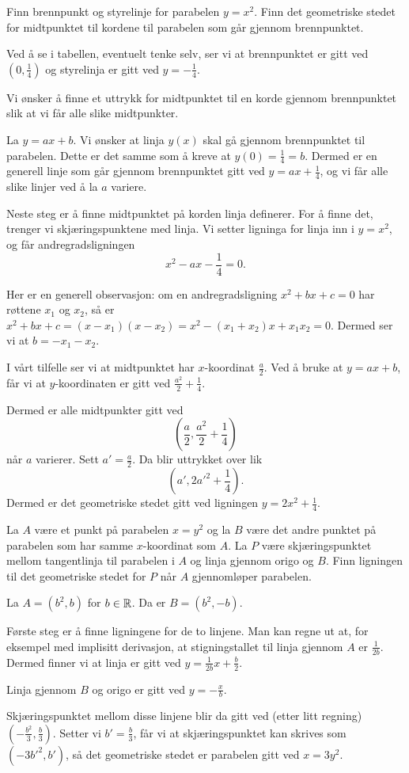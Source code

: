 \documentclass[11pt, norsk]{article}
\begin{document}
\begin{oppg}
Finn brennpunkt og styrelinje for parabelen $y=x^2$. Finn det geometriske stedet for midtpunktet til kordene til parabelen som går gjennom brennpunktet.
\end{oppg}
\begin{losn}
Ved å se i tabellen, eventuelt tenke selv, ser vi at brennpunktet er gitt ved $(0,\frac 14)$ og styrelinja er gitt ved $y=-\frac 14$.

Vi ønsker å finne et uttrykk for midtpunktet til en korde gjennom brennpunktet slik at vi får alle slike midtpunkter.

La $y=ax+b$. Vi ønsker at linja $y(x)$ skal gå gjennom brennpunktet til parabelen. Dette er det samme som å kreve at $y(0)=\frac 14=b$. Dermed er en generell linje som går gjennom brennpunktet gitt ved $y=ax+\frac 14$, og vi får alle slike linjer ved å la $a$ variere.

Neste steg er å finne midtpunktet på korden linja definerer. For å finne det, trenger vi skjæringspunktene med linja. Vi setter ligninga for linja inn i $y= x^2$, og får andregradsligningen $$x^2-ax-\frac 14=0.$$

Her er en generell observasjon: om en andregradsligning $x^2+bx+c=0$ har røttene $x_1$ og $x_2$, så er $x^2+bx+c=(x-x_1)(x-x_2)=x^2-(x_1+x_2)x+x_1x_2=0$. Dermed ser vi at $b=-x_1-x_2$.

I vårt tilfelle ser vi at midtpunktet har $x$-koordinat $\frac a2$. Ved å bruke at $y=ax+b$, får vi at $y$-koordinaten er gitt ved $\frac {a^2}{2}+\frac 14$. 

Dermed er alle midtpunkter gitt ved
$$\left( \frac a2 , \frac {a^2}{2}+\frac 14 \right) $$
når $a$ varierer. Sett $a' = \frac a2$. Da blir uttrykket over lik
$$\left( a', 2{a'}^2+\frac 14 \right) .$$
Dermed er det geometriske stedet gitt ved ligningen $y = 2x^2+\frac 14$. 
\end{losn}

\begin{oppg}
La $A$ være et punkt på parabelen $x=y^2$ og la $B$ være det andre punktet på parabelen som har samme $x$-koordinat som $A$. La $P$ være skjæringspunktet mellom tangentlinja til parabelen i $A$ og linja gjennom origo og $B$. Finn ligningen til det geometriske stedet for $P$ når $A$ gjennomløper parabelen.
\end{oppg}
\begin{losn}
La $A=(b^2,b)$ for $b \in \mathbb{R}$. Da er $B=(b^2,-b)$. 

Første steg er å finne ligningene for de to linjene. Man kan regne ut at, for eksempel med implisitt derivasjon, at stigningstallet til linja gjennom $A$ er $\frac{1}{2b}$. Dermed finner vi at linja er gitt ved $y = \frac{1}{2b}x + \frac{b}{2}$. 

Linja gjennom $B$ og origo er gitt ved $y= - \frac{x}{b}$.

Skjæringspunktet mellom disse linjene blir da gitt ved (etter litt regning) $\left( - \frac{b^2}{3}, \frac b3 \right)$. Setter vi $b' = \frac b3$, får vi at skjæringspunktet kan skrives som $ (-3{b'}^2,b')$, så det geometriske stedet er parabelen gitt ved $x= 3y^2$.
\end{losn}
\end{document}
